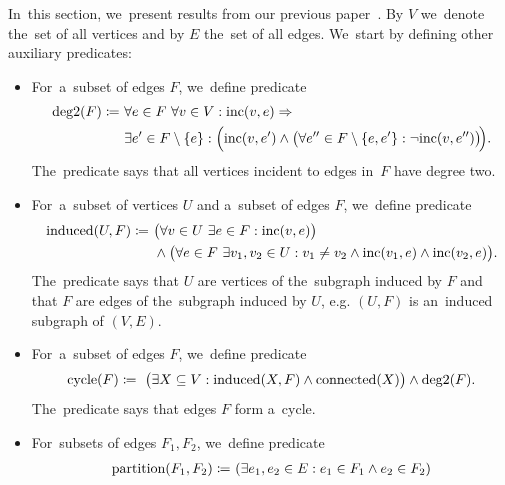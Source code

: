 In~this section, we~present results from our previous paper~\cite{my_paper}.
By \( V \) we~denote the~set of all vertices and
by \( E \) the~set of all edges.
We~start by defining other auxiliary predicates:
%
\begin{itemize}
	\item For~a~subset of edges \( F \), we~define predicate
	      \begin{align*}
		      \text{deg2}(F) \coloneqq \ 
					 & \forall e \in F \  \forall v \in V : \text{inc} (v, e) \Rightarrow                                                                      \\
		       & \exists e' \in F \setminus \{e\} : \Big( \text{inc} (v, e') \land \big(\forall e'' \in F \setminus \{e, e'\}: \lnot \text{inc} (v, e'')\big)\!\Big).
	      \end{align*}
	      The~predicate says that all vertices incident to edges in~\( F \) have degree two.
	\item For~a~subset of vertices \( U \) and a~subset of edges \( F \), we~define predicate
	      \begin{align*}
		      \text{induced}(U, F) \coloneqq \ 
		       & \big(\forall v \in U \  \exists e \in F : \text{inc} (v, e)\big)                                                       \\
		       & \land \big(\forall e \in F \  \exists v_1, v_2 \in U : v_1 \ne v_2 \land \text{inc} (v_1, e) \land \text{inc} (v_2, e)\big).
	      \end{align*}
	      The~predicate says that \( U \) are vertices of the~subgraph induced by \( F \)
	      and that \( F \) are edges of the~subgraph induced by \( U \),
	      e.g. \( (U, F) \) is an~induced subgraph of \( (V, E) \).
	\item For~a~subset of edges \( F \), we~define predicate
	      \begin{align*}
		      \text{cycle}(F) \coloneqq \ 
		      \big( \exists X \subseteq V : \text{induced}(X, F) \land \text{connected}(X) \big)
		      \land \text{deg2}(F).
	      \end{align*}
	      The~predicate says that edges \( F \) form a~cycle.
	\item For~subsets of edges \( F_1, F_2 \), we~define predicate
	      \begin{align*}
		      \text{partition}(F_1, F_2) \coloneqq \predsp
		       & (\exists e_1, e_2 \in E : e_1 \in F_1 \land e_2 \in F_2 )    \\

\end{align*}
\end{itemize}
